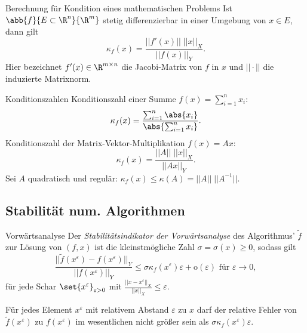 \begin{karte}{Berechnung für Kondition eines mathematischen Problems}
    Ist \( \abb{f}{E\subset \R^n}{\R^m} \) stetig differenzierbar in einer Umgebung von \( x\in E \), 
    dann gilt 
    \[ \kappa_f(x) = \frac{||f'(x)|| \; ||x||_X }{ ||f(x)||_Y }. \] 
    Hier bezeichnet \( f'(x) \in \R^{m\times n} \) die Jacobi-Matrix von \(f\) in \(x\) und \( ||\cdot|| \) die 
    induzierte Matrixnorm.
\end{karte}

\begin{karte}{Konditionszahlen}
    Konditionszahl einer Summe \( f(x) = \sum_{i=1}^n x_i \):
    \[ \kappa_f(x) = \frac{ \sum_{i=1}^n \abs{x_i} }{ \abs{ \sum_{i=1}^n x_i } }. \]
    Konditionszahl der Matrix-Vektor-Multiplikation \( f(x) = Ax \):
    \[ \kappa_f(x) = \frac{||A||\;||x||_X}{||Ax||_Y}. \]
    Sei \(A\) quadratisch und regulär: \(\kappa_f(x) \leq \kappa(A) = ||A||\;||A^{-1}||\). 
\end{karte}

\subsection*{Stabilität num. Algorithmen}

\begin{karte}{Vorwärtsanalyse}
    Der \textit{Stabilitätsindikator der Vorwärtsanalyse} des Algorithmus' 
    \( \tilde{f} \) zur Lösung von \( (f,x) \) ist die kleinstmögliche Zahl \( \sigma = \sigma(x) \geq 0 \), 
    sodass gilt 
    \[ \frac{ ||\tilde{f}(x^\varepsilon) - f(x^\varepsilon)||_Y }{||f(x^\varepsilon)||_Y} 
    \leq \sigma \kappa_f(x^\varepsilon)\varepsilon + \mathrm{o}(\varepsilon) \text{ für }\varepsilon \rightarrow 0, \]
    für jede Schar \( \set{x^\varepsilon}_{\varepsilon > 0} \) mit \( \frac{ ||x - x^\varepsilon||_X }{ ||x||_X } \leq \varepsilon \).

    Für jedes Element \( x^\varepsilon \) mit relativem Abstand \(\varepsilon\) zu \(x\) darf der relative 
    Fehler von \( \tilde{f}(x^\varepsilon) \) zu \( f(x^\varepsilon) \) im wesentlichen nicht größer sein als 
    \( \sigma \kappa_f(x^\varepsilon)\varepsilon \).
\end{karte}

